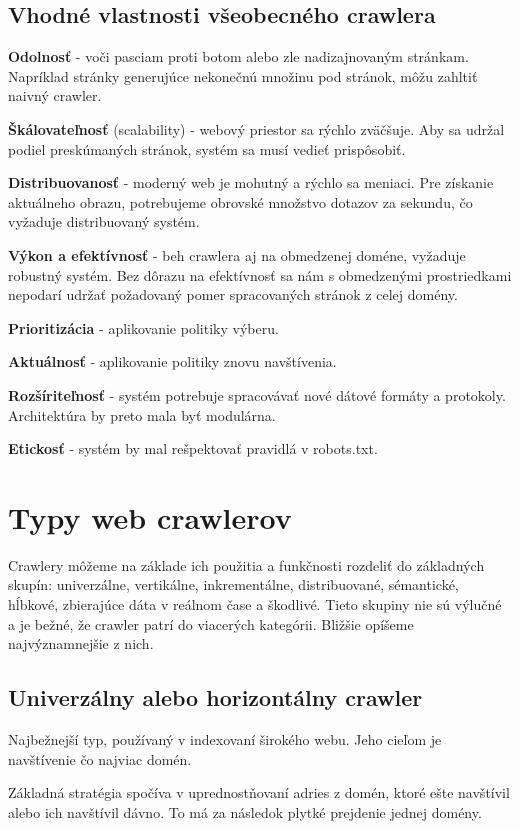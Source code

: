 \subsection{Vhodné vlastnosti všeobecného crawlera}

\textbf{Odolnosť} - voči pasciam proti botom alebo zle nadizajnovaným stránkam. Napríklad stránky generujúce nekonečnú množinu pod stránok, môžu zahltiť naivný crawler. 

\textbf{Škálovateľnosť} (scalability) - webový priestor sa rýchlo zväčšuje. Aby sa udržal podiel preskúmaných stránok, systém sa musí 
vedieť prispôsobiť. 

\textbf{Distribuovanosť} -  moderný web je mohutný a rýchlo sa meniaci. Pre získanie aktuálneho obrazu, potrebujeme obrovské množstvo dotazov za sekundu, čo vyžaduje distribuovaný systém. 

\textbf{Výkon a efektívnosť} - beh crawlera aj na obmedzenej doméne, vyžaduje robustný systém. Bez dôrazu na efektívnosť sa nám s obmedzenými prostriedkami nepodarí udržať požadovaný pomer spracovaných stránok z celej domény.

\textbf{Prioritizácia} - aplikovanie politiky výberu.

\textbf{Aktuálnosť} - aplikovanie politiky znovu navštívenia.

\textbf{Rozšíriteľnosť} - systém potrebuje spracovávať nové dátové formáty a protokoly. Architektúra by preto mala byť modulárna. 

\textbf{Etickosť} - systém by mal rešpektovať pravidlá v robots.txt.

\section{Typy web crawlerov}
Crawlery môžeme na základe ich použitia a funkčnosti rozdeliť do základných skupín: univerzálne, vertikálne, inkrementálne, distribuované, sémantické, hĺbkové, zbierajúce dáta v reálnom čase a škodlivé. Tieto skupiny nie sú výlučné a je bežné, že crawler patrí do viacerých kategórii. Bližšie opíšeme najvýznamnejšie z nich. 

\subsection{Univerzálny alebo horizontálny crawler}
Najbežnejší typ, používaný v indexovaní širokého webu. Jeho cieľom je navštívenie čo najviac domén.

Základná stratégia spočíva v uprednostňovaní adries z domén, ktoré ešte navštívil alebo ich navštívil dávno. To má za následok plytké prejdenie jednej domény. 

